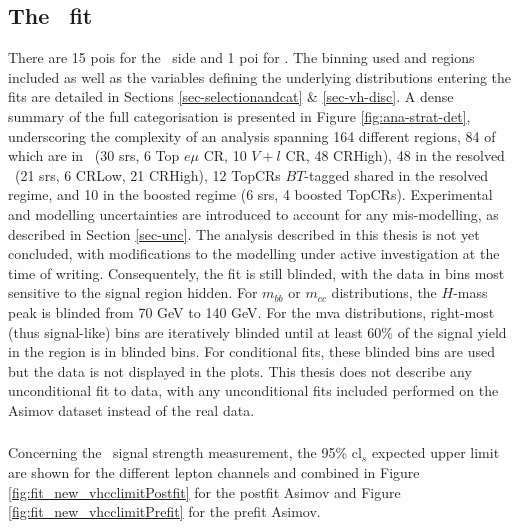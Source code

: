 \subsection[The \vhbc\ Fit]{The \boldvhbc\ fit}\label{subsec-subsecVHBCfit}
There are 15 \gls{poi}s for the \vhb\ side and 1 \gls{poi} for \vhc. The binning used and regions included as well as the variables defining the underlying distributions entering the fits are detailed in Sections \ref{sec-selectionandcat} \& \ref{sec-vh-disc}. A dense summary of the full categorisation is presented in Figure \ref{fig:ana-strat-det}, underscoring the complexity of an analysis spanning 164 different regions, 84 of which are in \vhc\ (30 \gls{sr}s, 6 Top $e\mu$ CR, 10 $V+l$ CR, 48 CRHigh), 48 in the resolved \vhb\ (21 \gls{sr}s, 6 CRLow, 21 CRHigh), 12 TopCRs $BT$-tagged shared in the resolved regime, and 10 in the boosted regime (6 \gls{sr}s, 4 boosted TopCRs). Experimental and modelling uncertainties are introduced to account for any mis-modelling, as described in Section \ref{sec-unc}. The analysis described in this thesis is not yet concluded, with modifications to the modelling under active investigation at the time of writing. Consequentely, the fit is still blinded, with the data in bins most sensitive to the signal region hidden. For $m_{bb}$ or $m_{cc}$ distributions, the $H$-mass peak is blinded from 70 GeV to 140 GeV. For the \gls{mva} distributions, right-most (thus signal-like) bins are iteratively blinded until at least 60\% of the signal yield in the region is in blinded bins. For conditional fits, these blinded bins are used but the data is not displayed in the plots. This thesis does not describe any unconditional fit to data, with any unconditional fits included performed on the Asimov dataset instead of the real data. %

\subsubsection{\boldvhc}
Concerning the \vhc\ signal strength measurement, the 95\% \gls{cl}$_s$ expected upper limit are shown for the different lepton channels and combined in Figure \ref{fig:fit_new_vhcclimitPostfit} for the postfit Asimov and Figure \ref{fig:fit_new_vhcclimitPrefit} for the prefit Asimov. %

